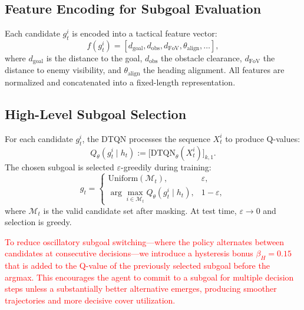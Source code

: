 \documentclass[letterpaper, 10 pt, conference]{ieeeconf}
\begin{document}
\subsection{Feature Encoding for Subgoal Evaluation}
Each candidate $g_t^i$ is encoded into a tactical feature vector:
\begin{equation}
f(g_t^i) = [d_{\text{goal}}, d_{\text{obs}}, d_{\text{FoV}}, \theta_{\text{align}}, \ldots],
\end{equation}
where $d_{\text{goal}}$ is the distance to the goal, $d_{\text{obs}}$ the obstacle clearance, $d_{\text{FoV}}$ the distance to enemy visibility, and $\theta_{\text{align}}$ the heading alignment. All features are normalized and concatenated into a fixed-length representation.

\subsection{High-Level Subgoal Selection}
For each candidate $g_t^i$, the DTQN processes the sequence $X_t^i$ to produce Q-values:
\begin{equation}
Q_\theta(g_t^i \mid h_t) := \big[\mathrm{DTQN}_\theta(X_t^i)\big]_{k,1}.
\end{equation}
The chosen subgoal is selected $\varepsilon$-greedily during training:
\begin{equation}
g_t =
\begin{cases}
\text{Uniform}(\mathcal{M}_t), & \varepsilon,\\[4pt]
\arg\max_{i \in \mathcal{M}_t} Q_\theta(g_t^i \mid h_t), & 1-\varepsilon,
\end{cases}
\end{equation}
where $\mathcal{M}_t$ is the valid candidate set after masking. At test time, $\varepsilon \!\to\! 0$ and selection is greedy.

\textcolor{red}{To reduce oscillatory subgoal switching---where the policy alternates between candidates at consecutive decisions---we introduce a hysteresis bonus $\beta_H = 0.15$ that is added to the Q-value of the previously selected subgoal before the argmax. This encourages the agent to commit to a subgoal for multiple decision steps unless a substantially better alternative emerges, producing smoother trajectories and more decisive cover utilization.}
\end{document}
